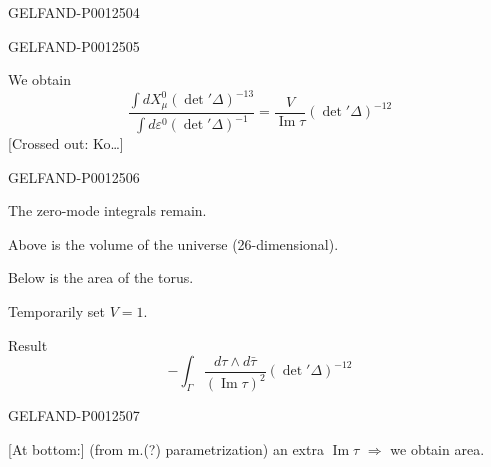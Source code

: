 \begin{GelfandAdjacentEvidence}{GELFAND-P001250}{4}

\end{GelfandAdjacentEvidence}
\begin{GelfandAdjacentEvidence}{GELFAND-P001250}{5}

We obtain
\begin{equation*}
\frac{\int dX_{\mu}^0(\det'\Delta)^{-13}}
{\int d\varepsilon^0(\det'\Delta)^{-1}}
=\frac{V}{\operatorname{Im}\tau}(\det'\Delta)^{-12}\tag{16}
\end{equation*}
[Crossed out: Ko…]
\end{GelfandAdjacentEvidence}
\begin{GelfandAdjacentEvidence}{GELFAND-P001250}{6}

The zero-mode integrals remain.

Above is the volume of the universe (26-dimensional).

Below is the area of the torus.

Temporarily set $V=1$.

Result
\begin{equation*}
-\int_{\Gamma}
\frac{d\tau\wedge d\bar\tau}
{(\operatorname{Im}\tau)^2}(\det'\Delta)^{-12}\tag{17}
\end{equation*}
\end{GelfandAdjacentEvidence}
\begin{GelfandAdjacentEvidence}{GELFAND-P001250}{7}

[At bottom:] (from m.(?) parametrization) an extra $\operatorname{Im}\tau$ $\Longrightarrow$ we obtain area.
\end{GelfandAdjacentEvidence}



